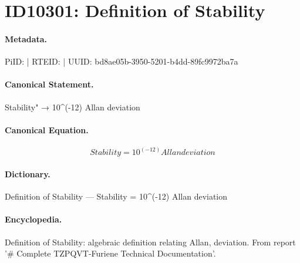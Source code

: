 \section*{ID10301: Definition of Stability}
\paragraph{Metadata.}
PiID:  | RTEID:  | UUID: bd8ae05b-3950-5201-b4dd-89fc9972ba7a

\paragraph{Canonical Statement.}
Stability" → 10\textasciicircum{}(-12) Allan deviation

\paragraph{Canonical Equation.}
\[
Stability = 10^(-12) Allan deviation
\]

\paragraph{Dictionary.}
Definition of Stability — Stability = 10\textasciicircum{}(-12) Allan deviation

\paragraph{Encyclopedia.}
Definition of Stability: algebraic definition relating Allan, deviation. From report '\# Complete TZPQVT-Furiene Technical Documentation'.
